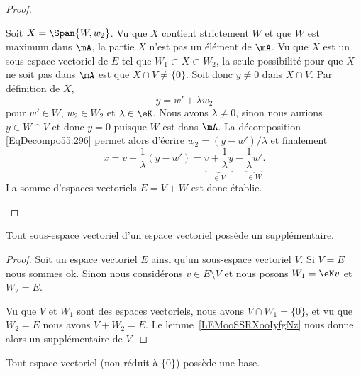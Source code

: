 \begin{proof}
\begin{subproof}
            Soit \( X=\Span\{ W,w_2 \}\). Vu que \( X\) contient strictement \( W\) et que \( W\) est maximum dans \( \mA\), la partie \( X\) n'est pas un élément de \( \mA\). Vu que \( X\) est un sous-espace vectoriel de \( E\) tel que \( W_1\subset X\subset W_2\), la seule possibilité pour que \( X\) ne soit pas dans \( \mA\) est que \( X\cap V\neq \{ 0 \}\). Soit donc \( y\neq 0\) dans \( X\cap V\). Par définition de \( X\),
            \begin{equation}\label{EqDecompo55:296}
                y=w'+\lambda w_2
            \end{equation}
            pour \( w'\in W\), \( w_2\in W_2\) et \( \lambda\in \eK\). Nous avons \( \lambda\neq 0\), sinon nous aurions \( y\in W\cap V \) et donc \(y = 0 \) puisque \( W \) est dans \( \mA \). La décomposition \eqref{EqDecompo55:296} permet alors d'écrire \( w_2=(y-w')/\lambda\) et finalement
            \begin{equation}
                x=v+\frac{1}{ \lambda }(y-w')=\underbrace{v+\frac{1}{ \lambda }y}_{\in V}-\underbrace{\frac{1}{ \lambda }w'}_{\in W}.
            \end{equation}
            La somme d'espaces vectoriels \( E=V+W\) est donc établie.
    \end{subproof}
\end{proof}

\begin{corollary}
    Tout sous-espace vectoriel d'un espace vectoriel possède un supplémentaire.
\end{corollary}

\begin{proof}
    Soit un espace vectoriel \( E\) ainsi qu'un sous-espace vectoriel \( V\). Si \( V=E\) nous sommes ok. Sinon nous considérons \( v\in E\setminus V\) et nous posons \( W_1=\eK v\) et \( W_2=E\).

    Vu que \( V\) et \( W_1\) sont des espaces vectoriels, nous avons \( V\cap W_1=\{ 0 \}\), et vu que \( W_2=E\) nous avons \( V+W_2=E\). Le lemme~\ref{LEMooSSRXooIyfgNz} nous donne alors un supplémentaire de \( V\).
\end{proof}

\begin{proposition}        \label{PROPooHDCEooMhDjPi}
    Tout espace vectoriel (non réduit à \( \{ 0 \}\)) possède une base.
\end{proposition}

